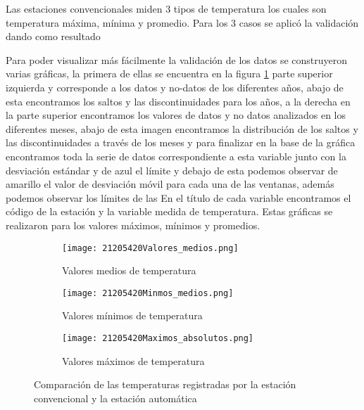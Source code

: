\documentclass[11pt]{article}
\begin{document}
Las estaciones convencionales miden 3 tipos de temperatura los cuales son temperatura máxima, mínima y promedio. Para los 3 casos se aplicó la validación dando como resultado 

Para poder visualizar más fácilmente la validación de los datos se construyeron varias gráficas, la primera de ellas se encuentra en la figura \ref{subfig:b11} parte superior izquierda y corresponde a los datos y no-datos de los diferentes años, abajo de esta encontramos los saltos y las discontinuidades para los años, a la derecha en la parte superior encontramos los valores de datos y no datos analizados en los diferentes meses, abajo de esta imagen encontramos la distribución de los saltos y las discontinuidades a través de los meses y para finalizar en la base de la gráfica encontramos toda la serie de datos correspondiente a esta variable junto con la desviación estándar y de azul el límite y debajo de esta podemos observar de amarillo el valor de desviación móvil para cada una de las ventanas, además podemos observar los límites de las  En el título de cada variable encontramos el código de la estación y la variable medida de temperatura. Estas gráficas se realizaron para los valores máximos, mínimos y promedios.

\begin{figure}[H]
	
			\begin{subfigure}[b]{\linewidth}
			\begin{center}
			\texttt{[image: 21205420Valores\_medios.png]}
			\caption{Valores medios de temperatura}
			\label{subfig:b11}
			\end{center}
			\end{subfigure}
			
			\begin{subfigure}[b]{\linewidth}
			\begin{center}
			\texttt{[image: 21205420Minmos\_medios.png]}
			\caption{Valores mínimos de temperatura}
			\label{subfig:b21}
			\end{center}
			\end{subfigure}			

			\begin{subfigure}[b]{\linewidth}
			\begin{center}
			\texttt{[image: 21205420Maximos\_absolutos.png]}
			\caption{Valores máximos de temperatura}
			\label{subfig:b31}
			\end{center}
			\end{subfigure}			

		
		\caption{Comparación de las temperaturas registradas por la estación convencional y la estación automática}
		\label{gra:conv_vali}
	


\end{figure}
\end{document}
